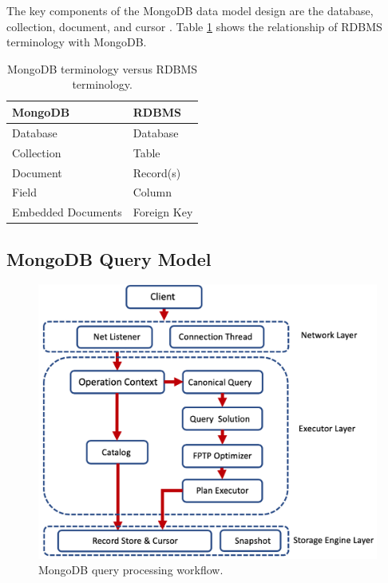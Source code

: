 The key components of the MongoDB data model design are the database, collection, document, and cursor \cite{banker2011mongodb}.
Table \ref{table:terms} shows the relationship of RDBMS terminology with MongoDB. 

\begin{table}[htb]
    \begin{tabular}{ll}
        \toprule
        MongoDB    &    RDBMS\\
        \midrule
        Database    &      Database\\
        Collection   &      Table\\
        Document      &     Record(s)\\
        Field          &      Column\\
        Embedded Documents &  Foreign Key\\
        \bottomrule
    \end{tabular}
    
    \caption{MongoDB terminology versus RDBMS terminology.}
    \label{table:terms}
\end{table}

\subsection{MongoDB Query Model}

\begin{figure}[t]
  \centering
  \includegraphics[width=0.9\linewidth]{images/body/overview.png}
  \caption{MongoDB query processing workflow.}
  \label{fig:workflow}
\end{figure}

